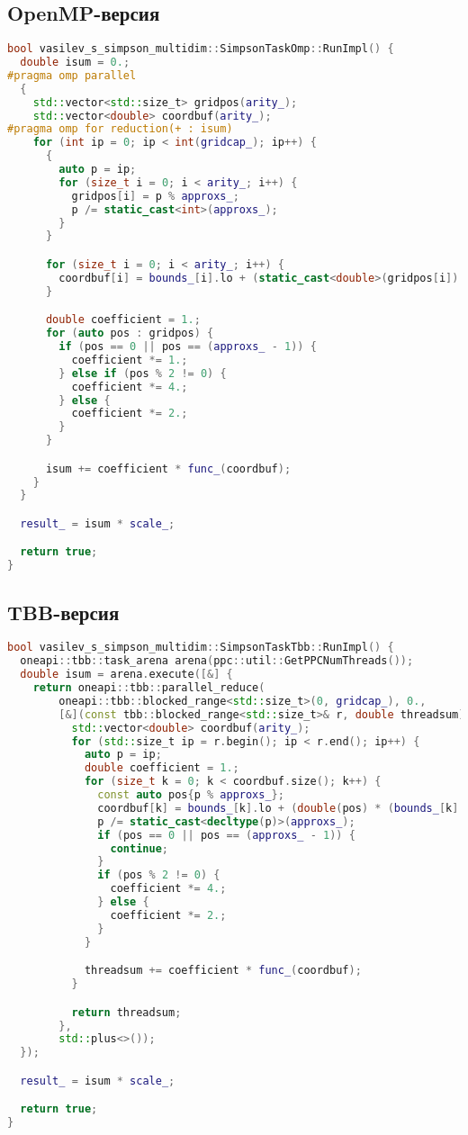 \documentclass[14pt,a4paper]{extarticle}
\begin{document}
\subsection{OpenMP-версия}
\begin{lstlisting}[language=C++]
bool vasilev_s_simpson_multidim::SimpsonTaskOmp::RunImpl() {
  double isum = 0.;
#pragma omp parallel
  {
    std::vector<std::size_t> gridpos(arity_);
    std::vector<double> coordbuf(arity_);
#pragma omp for reduction(+ : isum)
    for (int ip = 0; ip < int(gridcap_); ip++) {
      {
        auto p = ip;
        for (size_t i = 0; i < arity_; i++) {
          gridpos[i] = p % approxs_;
          p /= static_cast<int>(approxs_);
        }
      }

      for (size_t i = 0; i < arity_; i++) {
        coordbuf[i] = bounds_[i].lo + (static_cast<double>(gridpos[i]) * steps_[i]);
      }

      double coefficient = 1.;
      for (auto pos : gridpos) {
        if (pos == 0 || pos == (approxs_ - 1)) {
          coefficient *= 1.;
        } else if (pos % 2 != 0) {
          coefficient *= 4.;
        } else {
          coefficient *= 2.;
        }
      }

      isum += coefficient * func_(coordbuf);
    }
  }

  result_ = isum * scale_;

  return true;
}
\end{lstlisting}

\subsection{TBB-версия}
\begin{lstlisting}[language=C++]
bool vasilev_s_simpson_multidim::SimpsonTaskTbb::RunImpl() {
  oneapi::tbb::task_arena arena(ppc::util::GetPPCNumThreads());
  double isum = arena.execute([&] {
    return oneapi::tbb::parallel_reduce(
        oneapi::tbb::blocked_range<std::size_t>(0, gridcap_), 0.,
        [&](const tbb::blocked_range<std::size_t>& r, double threadsum) {
          std::vector<double> coordbuf(arity_);
          for (std::size_t ip = r.begin(); ip < r.end(); ip++) {
            auto p = ip;
            double coefficient = 1.;
            for (size_t k = 0; k < coordbuf.size(); k++) {
              const auto pos{p % approxs_};
              coordbuf[k] = bounds_[k].lo + (double(pos) * (bounds_[k].hi - bounds_[k].lo) / double(approxs_));
              p /= static_cast<decltype(p)>(approxs_);
              if (pos == 0 || pos == (approxs_ - 1)) {
                continue;
              }
              if (pos % 2 != 0) {
                coefficient *= 4.;
              } else {
                coefficient *= 2.;
              }
            }

            threadsum += coefficient * func_(coordbuf);
          }

          return threadsum;
        },
        std::plus<>());
  });

  result_ = isum * scale_;

  return true;
}
\end{lstlisting}
\end{document}
